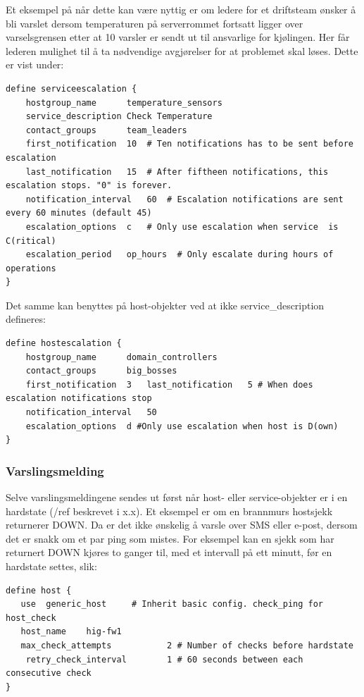 Et eksempel på når dette kan være nyttig er om ledere for et driftsteam ønsker å bli varslet dersom temperaturen på serverrommet fortsatt ligger over varselsgrensen etter at 10 varsler er sendt ut til ansvarlige for kjølingen. Her får lederen mulighet til å ta nødvendige avgjørelser for at problemet skal løses. Dette er vist under:
\begin{lstlisting}
define serviceescalation {
	hostgroup_name		temperature_sensors
	service_description	Check Temperature
	contact_groups		team_leaders
	first_notification	10	# Ten notifications has to be sent before escalation
	last_notification	15	# After fiftheen notifications, this escalation stops. "0" is forever.
	notification_interval	60 	# Escalation notifications are sent every 60 minutes (default 45)
	escalation_options	c	# Only use escalation when service  is C(ritical)
	escalation_period	op_hours  # Only escalate during hours of operations
}
\end{lstlisting}
Det samme kan benyttes på host-objekter ved at ikke service\_description defineres:
\begin{lstlisting}
define hostescalation {
	hostgroup_name		domain_controllers
	contact_groups		big_bosses
	first_notification	3 	last_notification	5 # When does escalation notifications stop
	notification_interval	50
	escalation_options	d #Only use escalation when host is D(own)
}
\end{lstlisting}

\subsubsection{Varslingsmelding}

Selve varslingsmeldingene sendes ut først når host- eller service-objekter er i en hardstate (/ref beskrevet i x.x). Et eksempel er om en brannmurs hostsjekk returnerer DOWN. Da er det ikke ønskelig å varsle over SMS eller e-post, dersom det er snakk om et par ping som mistes. For eksempel kan en sjekk som har returnert DOWN kjøres to ganger til, med et intervall på ett minutt, før en hardstate settes, slik:

\begin{lstlisting}
define host {
   use 	generic_host     # Inherit basic config. check_ping for host_check
   host_name	hig-fw1
   max_check_attempts           2 # Number of checks before hardstate
    retry_check_interval        1 # 60 seconds between each consecutive check
}
\end{lstlisting}

